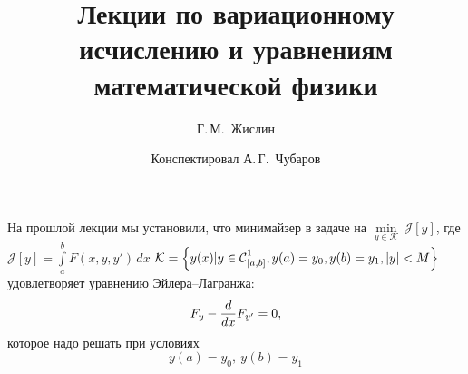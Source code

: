 \documentclass[12pt,a4paper,openany,fleqn]{book}
\newcommand{\Cf}{\ensuremath{\mathcal{C}}}
\newcommand{\J}{\ensuremath{\mathcal{J}}}
\newcommand{\mc}[1]{\ensuremath{\mathcal{#1}}}
\newcommand{\Cfn}[2][]{\ensuremath{\Cf{\mathstrut}^{#2}_{#1}}}
\newcommand{\der}[2]{\ensuremath{\frac{d#1}{d#2}}}
\newcommand{\K}{\mc{K}}
\theoremstyle{definition}
\begin{document}
	\author{Г.\,М.~Жислин}
	\title{Лекции по вариационному исчислению и уравнениям математической физики}
	\date{Конспектировал А.\,Г.~Чубаров}
	
	
	
	\maketitle
	
	
	\renewcommand{\thepart}{\Asbuk{part}}
	\renewcommand{\thechapter}{\arabic{chapter}}
	\renewcommand{\thesection}{\arabic{section}}
	\renewcommand{\thesubsection}{\Roman{subsection}}
	\renewcommand{\thefootnote}{\roman{footnote}}
	\renewcommand{\phi}{\varphi}
	
\setcounter{chapter}{1}
	\chapter{}
	\label{lecture2}
	
	\noindent На прошлой лекции мы установили, что минимайзер в задаче на $\min\limits_{y\in\K}\,\J[y]$, где  $\J[y]=\int\limits_a^b F(x,y,y')\,dx$ $\K=\left\{y(x)|y\in\Cfn[{[a,b]}]{1}, y(a)=y_0, y(b)=y_1, |y|<M\right\}$ удовлетворяет уравнению Эйлера--Лагранжа:
	\begin{equation}
		\label{l2:eq:1}
		\hfill F_y-\der{}{x}F_{y'}=0,\hfill
	\end{equation} 
	которое надо решать при условиях 
	\begin{equation}
		\label{l2:eq:2}
		y(a)=y_0,\ y(b)=y_1
	\end{equation}
\end{document}
